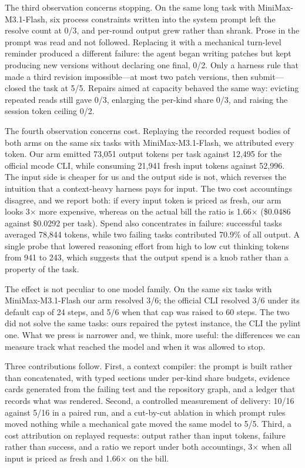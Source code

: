 The third observation concerns stopping.
On the same long task with MiniMax-M3.1-Flash, six process constraints written into the system prompt left the resolve count at 0/3, and per-round output grew rather than shrank.
Prose in the prompt was read and not followed.
Replacing it with a mechanical turn-level reminder produced a different failure: the agent began writing patches but kept producing new versions without declaring one final, 0/2.
Only a harness rule that made a third revision impossible---at most two patch versions, then submit---closed the task at 5/5.
Repairs aimed at capacity behaved the same way: evicting repeated reads still gave 0/3, enlarging the per-kind share 0/3, and raising the session token ceiling 0/2.

The fourth observation concerns cost.
Replaying the recorded request bodies of both arms on the same six tasks with MiniMax-M3.1-Flash, we attributed every token.
Our arm emitted 73,051 output tokens per task against 12,495 for the official mcode CLI, while consuming 21,941 fresh input tokens against 52,996.
The input side is cheaper for us and the output side is not, which reverses the intuition that a context-heavy harness pays for input.
The two cost accountings disagree, and we report both: if every input token is priced as fresh, our arm looks 3$\times$ more expensive, whereas on the actual bill the ratio is 1.66$\times$ (\$0.0486 against \$0.0292 per task).
Spend also concentrates in failure: successful tasks averaged 78,844 tokens, while two failing tasks contributed 70.9\% of all output.
A single probe that lowered reasoning effort from high to low cut thinking tokens from 941 to 243, which suggests that the output spend is a knob rather than a property of the task.

The effect is not peculiar to one model family.
On the same six tasks with MiniMax-M3.1-Flash our arm resolved 3/6; the official CLI resolved 3/6 under its default cap of 24 steps, and 5/6 when that cap was raised to 60 steps.
The two did not solve the same tasks: ours repaired the pytest instance, the CLI the pylint one.
What we press is narrower and, we think, more useful: the differences we can measure track what reached the model and when it was allowed to stop.

Three contributions follow.
First, a context compiler: the prompt is built rather than concatenated, with typed sections under per-kind share budgets, evidence cards generated from the failing test and the repository graph, and a ledger that records what was rendered.
Second, a controlled measurement of delivery: 10/16 against 5/16 in a paired run, and a cut-by-cut ablation in which prompt rules moved nothing while a mechanical gate moved the same model to 5/5.
Third, a cost attribution on replayed requests: output rather than input tokens, failure rather than success, and a ratio we report under both accountings, 3$\times$ when all input is priced as fresh and 1.66$\times$ on the bill.

